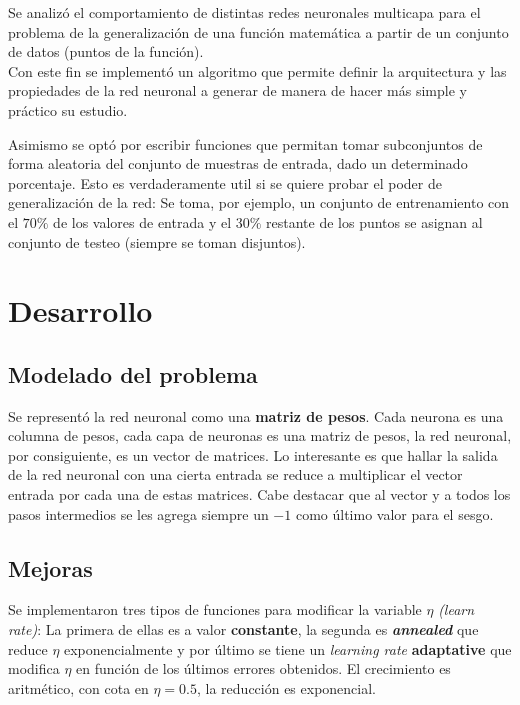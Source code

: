 \documentclass[%
    final,
    reprint,
    notitlepage,
    narroweqnarray,
    inline,
    twoside,
    invited
    ]{ieee}
\begin{document}
\par Se analizó el comportamiento de distintas redes neuronales multicapa para el problema de la generalización de una función matemática a partir de un conjunto de datos (puntos de la función).\\
Con este fin se implementó un algoritmo que permite definir la arquitectura y las propiedades de la red neuronal a generar de manera de hacer más simple y práctico su estudio. \\
\par Asimismo se optó por escribir funciones que permitan tomar subconjuntos de forma aleatoria del conjunto de muestras de entrada, dado un determinado porcentaje. Esto es verdaderamente util si se quiere probar el poder de generalización de la red: Se toma, por ejemplo, un conjunto de entrenamiento con el $70\%$ de los valores de entrada y el $30\%$ restante de los puntos se asignan al conjunto de testeo (siempre se toman disjuntos).


\section{Desarrollo}

\subsection{Modelado del problema}

\par Se representó la red neuronal como una \textbf{matriz de pesos}. Cada neurona es una columna de pesos, cada capa de 
neuronas es una matriz de pesos, la red neuronal, por consiguiente, es un vector de matrices. Lo interesante es que hallar 
la salida de la red neuronal con una cierta entrada se reduce a multiplicar el vector entrada por cada una de estas matrices. Cabe destacar 
que al vector y a todos los pasos intermedios se les agrega siempre un $-1$ como último valor para el sesgo.\\

\subsection{Mejoras}

\par Se implementaron tres tipos de funciones para modificar la variable $\eta$ \textit{(learn rate)}: 
La primera de ellas es a valor \textbf{constante}, la segunda es \textbf{\textit{annealed}} que reduce $\eta$ exponencialmente y 
por último se tiene un \textit{learning rate} \textbf{adaptative} que modifica $\eta$ en función de los últimos errores obtenidos. 
El crecimiento es aritmético, con cota en $\eta =0.5$, la reducción es exponencial.\\
\end{document}
